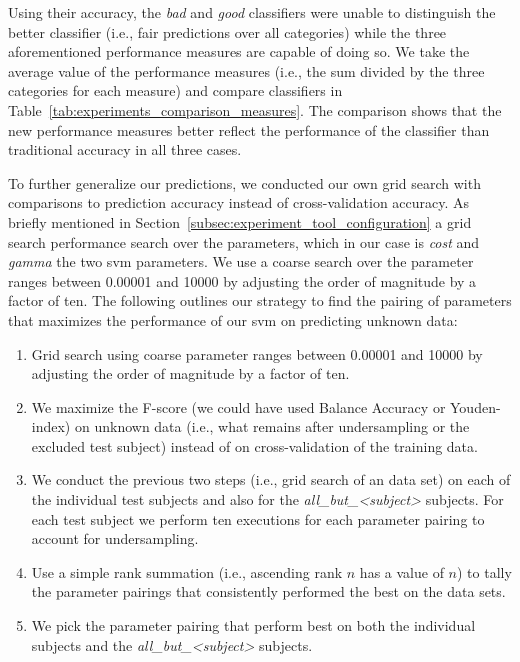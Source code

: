 Using their accuracy, the \emph{bad} and \emph{good} classifiers were unable to distinguish the better classifier (i.e., fair predictions over all categories) while the three aforementioned performance measures are capable of doing so. We take the average value of the performance measures (i.e., the sum divided by the three categories for each measure) and compare classifiers in Table~\ref{tab:experiments_comparison_measures}. The comparison shows that the new performance measures better reflect the performance of the classifier than traditional accuracy in all three cases.

To further generalize our predictions, we conducted our own grid search with comparisons to prediction accuracy  instead of cross-validation accuracy. As briefly mentioned in Section~\ref{subsec:experiment_tool_configuration} a grid search performance search over the parameters, which in our case is \emph{cost} and \emph{gamma} the two \gls{svm} parameters. We use a coarse search over the parameter ranges between 0.00001 and 10000 by adjusting the order of magnitude by a factor of ten. The following outlines our strategy to find the pairing of parameters that maximizes the performance of our \gls{svm} on predicting unknown data:

\begin{enumerate}
  \item Grid search using coarse parameter ranges between 0.00001 and 10000 by adjusting the order of magnitude by a factor of ten.
  \item We maximize the F-score (we could have used Balance Accuracy or Youden-index) on unknown data (i.e., what remains after undersampling or the excluded test subject) instead of on cross-validation of the training data.
  \item We conduct the previous two steps (i.e., grid search of an data set) on each of the individual test subjects and also for the \emph{all\_but\_<subject>} subjects. For each test subject we perform ten executions for each parameter pairing to account for  undersampling.
  \item Use a simple rank summation (i.e., ascending rank $n$ has a value of $n$) to tally the parameter pairings that consistently performed the best on the data sets.
  \item We pick the parameter pairing that perform best on both the individual subjects and the \emph{all\_but\_<subject>} subjects.
\end{enumerate}

